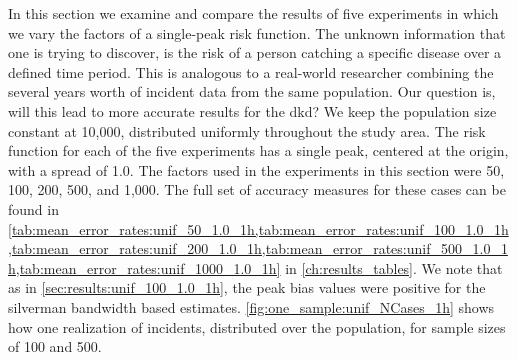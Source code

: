 In this section we examine and compare the results of five experiments in which we vary the \glspl{factor}
of a single-peak risk function.
The unknown information that one is trying to discover, is the risk of a person catching a specific disease over a defined time period.
This is analogous to a real-world researcher combining the several years worth of incident data from the same population.
Our question is, will this lead to more accurate results for the \gls{dkd}?
We keep the population size constant at 10,000, distributed uniformly throughout the study area.
The risk function for each of the five experiments has a single peak,
centered at the origin,
with a \gls{spread} of 1.0.
The \glspl{factor} used in the experiments in this section were 50, 100, 200, 500, and 1,000.
The full set of accuracy measures for these cases can be found in \cref{tab:mean_error_rates:unif_50_1.0_1h,tab:mean_error_rates:unif_100_1.0_1h,tab:mean_error_rates:unif_200_1.0_1h,tab:mean_error_rates:unif_500_1.0_1h,tab:mean_error_rates:unif_1000_1.0_1h} in \autoref{ch:results_tables}.
We note that as in \cref{sec:results:unif_100_1.0_1h}, the \gls{peak bias} values were positive for the \gls{silverman} bandwidth based estimates.
\autoref{fig:one_sample:unif_NCases_1h} shows how one realization of incidents, distributed over the population, for sample sizes of 100 and 500.

